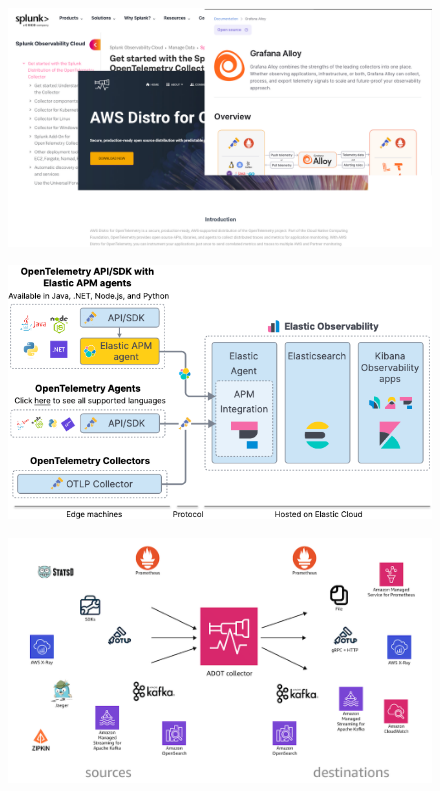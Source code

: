 \documentclass[aspectratio=169]{beamer}
\begin{document}
	\begin{frame}
		
		\begin{figure}
			\centering
			\includegraphics[width=\linewidth]{Images/oteldistros}
			\label{fig:oteldistros}
		\end{figure}
		
		
	\end{frame}
	
	
	
	\begin{frame}
		\begin{figure}
			\centering
			\includegraphics[width=0.8\linewidth]{Images/elasticotel}
			\label{fig:elasticotel}
		\end{figure}
	\end{frame}
	
	\begin{frame}
\begin{figure}
	\centering
	\label{fig:adotcollector}
	\includegraphics[width=0.8\linewidth]{Images/adotcollector}
\end{figure}
	\end{frame}
	
\end{document}
